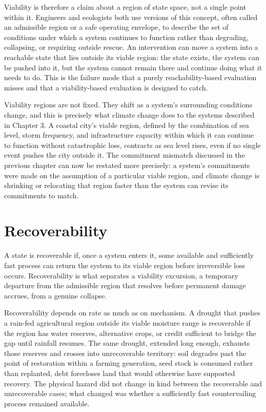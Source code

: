 \documentclass[11pt,oneside]{book}
\begin{document}
Viability is therefore a claim about a region of state space, not a single point within it. Engineers and ecologists both use versions of this concept, often called an admissible region or a safe operating envelope, to describe the set of conditions under which a system continues to function rather than degrading, collapsing, or requiring outside rescue. An intervention can move a system into a reachable state that lies outside its viable region: the state exists, the system can be pushed into it, but the system cannot remain there and continue doing what it needs to do. This is the failure mode that a purely reachability-based evaluation misses and that a viability-based evaluation is designed to catch.

Viability regions are not fixed. They shift as a system's surrounding conditions change, and this is precisely what climate change does to the systems described in Chapter 3. A coastal city's viable region, defined by the combination of sea level, storm frequency, and infrastructure capacity within which it can continue to function without catastrophic loss, contracts as sea level rises, even if no single event pushes the city outside it. The commitment mismatch discussed in the previous chapter can now be restated more precisely: a system's commitments were made on the assumption of a particular viable region, and climate change is shrinking or relocating that region faster than the system can revise its commitments to match.

\section*{Recoverability}

A state is recoverable if, once a system enters it, some available and sufficiently fast process can return the system to its viable region before irreversible loss occurs. Recoverability is what separates a viability excursion, a temporary departure from the admissible region that resolves before permanent damage accrues, from a genuine collapse.

Recoverability depends on rate as much as on mechanism. A drought that pushes a rain-fed agricultural region outside its viable moisture range is recoverable if the region has water reserves, alternative crops, or credit sufficient to bridge the gap until rainfall resumes. The same drought, extended long enough, exhausts those reserves and crosses into unrecoverable territory: soil degrades past the point of restoration within a farming generation, seed stock is consumed rather than replanted, debt forecloses land that would otherwise have supported recovery. The physical hazard did not change in kind between the recoverable and unrecoverable cases; what changed was whether a sufficiently fast countervailing process remained available.
\end{document}
